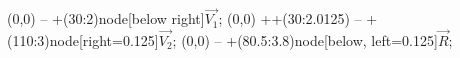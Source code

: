 \documentclass{standalone}
\begin{document}
\begin{myTikz}[]{4.25}
	 (0,0) -- +(30:2)node[below right]{$\vec{V_1}$};
	 (0,0) ++(30:2.0125) -- +(110:3)node[right=0.125]{$\vec{V_2}$};
	 (0,0) -- +(80.5:3.8)node[below, left=0.125]{$\vec{R}$};
\end{myTikz}
\end{document}
